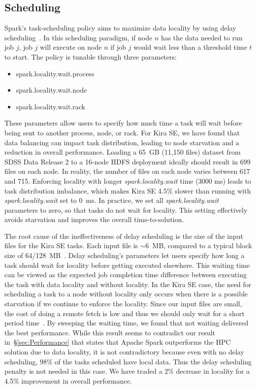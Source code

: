 \documentclass[10pt,journal,compsoc]{IEEEtran}
\begin{document}
\subsection{Scheduling}

Spark's task-scheduling policy aims to maximize data locality by using
delay scheduling~\cite{zaharia10ds}. In this scheduling paradigm, if node $n$ has the data needed
to run job $j$, job $j$ will execute on node $n$ if job $j$ would wait less than a threshold time
$t$ to start. The policy is tunable through three parameters:

\begin{itemize}
\item{spark.locality.wait.process}
\item{spark.locality.wait.node}
\item{spark.locality.wait.rack}
\end{itemize}

These parameters allow users to specify how much time a task will wait before being sent to another
process, node, or rack. For Kira SE, we have found that data balancing can 
impact task distribution, leading to node starvation and a reduction in overall performance.
Loading a 65~GB (11,150 files) dataset from SDSS Data Release 2 to a 16-node HDFS deployment ideally should result in 699 files on each node.
In reality, the number of files on each node varies between 617 and 715.
Enforcing locality with longer {\em spark.locality.wait} time (3000 ms) leads to task distribution imbalance, which makes
Kira SE 4.5\% slower than running with {\em spark.locality.wait} set to 0~ms.
In practice, we set all {\em spark.locality.wait} parameters to zero, so that tasks do not wait for locality.
This setting effectively avoids starvation and improves the overall time-to-solution.

The root cause of the ineffectiveness of delay scheduling is the size of the input files for the Kira SE tasks. 
Each input file is $\sim$6~MB, compared to a typical block size of 64/128~MB~\cite{shvachko10}.
Delay scheduling's parameters let users specify how long a task should wait for locality before getting executed elsewhere.
This waiting time can be viewed as the expected job completion time difference between executing the task with data locality and without locality.
In the Kira SE case, the need for scheduling a task to a node without locality only occurs when there is a possible
starvation if we continue to enforce the locality. Since our input files are small, the cost of doing a remote fetch is low and thus we should only
wait for a short period time~\cite{ananthanarayanan11}. By sweeping the waiting time, we found that not waiting delivered the best performance.
While this result seems to contradict our result in~\S\ref{sec:Performance} that states that Apache Spark outperforms
the HPC solution due to data locality, it is not contradictory because even with no delay scheduling, 
98\% of the tasks scheduled have local data.  Thus the delay scheduling penalty is not needed in this case.   
We have traded a 2\% decrease in locality for a 4.5\% improvement in overall performance.
\end{document}
